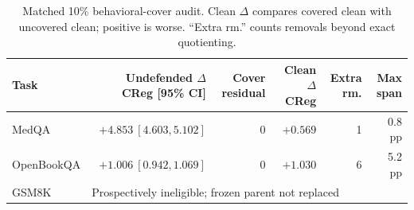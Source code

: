 \begin{table}[H]
\centering
\caption{Matched 10\% behavioral-cover audit. Clean $\Delta$ compares covered clean with uncovered clean; positive is worse. ``Extra rm.'' counts removals beyond exact quotienting.}
\label{tab:defense}
\scriptsize
\setlength{\tabcolsep}{2.8pt}
\begin{tabular*}{\linewidth}{@{\extracolsep{\fill}}lrrrrr@{}}
\toprule
Task & Undefended $\Delta$ CReg [95\% CI] & Cover residual & Clean $\Delta$ CReg & Extra rm. & Max span \\
\midrule
MedQA      & $+4.853\ [4.603,5.102]$ & $0$ & $+0.569$ & 1 & 0.8 pp \\
OpenBookQA & $+1.006\ [0.942,1.069]$ & $0$ & $+1.030$ & 6 & 5.2 pp \\
GSM8K      & \multicolumn{5}{l}{Prospectively ineligible; frozen parent not replaced} \\
\bottomrule
\end{tabular*}
\end{table}

